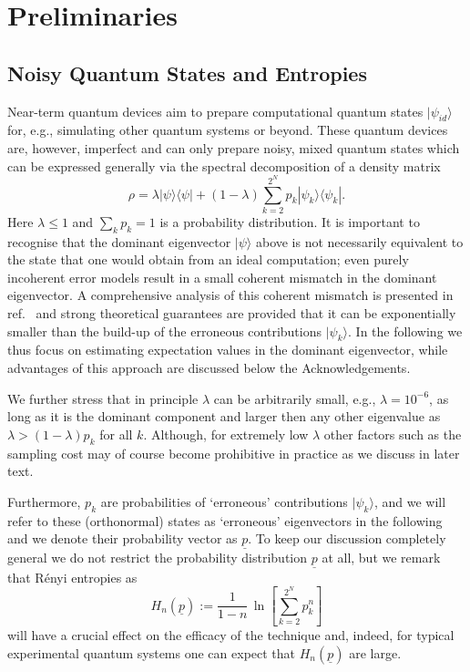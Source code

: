 \documentclass[aps,prx,showpacs,twocolumn,reprint]{revtex4-2}
\begin{document}
\section{Preliminaries}

\subsection{Noisy Quantum States and Entropies}

Near-term quantum devices aim to prepare computational
quantum states $| \psi_{id} \rangle$ for, e.g., simulating other quantum systems or beyond.
These quantum devices are, however, imperfect and can only prepare noisy, mixed quantum states
which can be expressed generally via the spectral decomposition of a density matrix	
\begin{equation}\label{rhodef}
\rho = \lambda | \psi \rangle \langle \psi  | + (1-\lambda) \sum_{k=2}^{2^N} p_k | \psi_k \rangle \langle \psi_k  |.
\end{equation}
Here $\lambda \leq 1$ and $\sum_k p_k = 1$ is a probability distribution. 
It is important to recognise that the dominant eigenvector $| \psi \rangle$ above is not necessarily
equivalent to the state that one would obtain from an ideal computation; even 
purely incoherent error models result in a small coherent mismatch in the dominant eigenvector.
A comprehensive analysis of this coherent mismatch is presented in ref.~\cite{koczor2021dominant}
and strong theoretical guarantees are provided that it can be exponentially smaller
than the build-up of the erroneous contributions $ | \psi_k \rangle$.
In the following we thus focus on estimating expectation values in the dominant eigenvector,
while advantages of this approach are discussed below the Acknowledgements.


We further stress that in principle $\lambda$ can be arbitrarily small, e.g., $\lambda=10^{-6}$,
as long as it is the dominant component and larger then any other eigenvalue
as $\lambda > (1-\lambda) p_k$ for all $k$.
Although, for extremely low $\lambda$ other factors such as the sampling cost
may of course become prohibitive in practice as we discuss in later text.

Furthermore, $p_k$ are probabilities of `erroneous' contributions $| \psi_k \rangle$,
and we will refer to these (orthonormal) states as `erroneous' eigenvectors in the following
and we denote their probability vector as $\underline{p}$.
To keep our discussion completely general we do not restrict the probability distribution $\underline{p}$
at all, but we remark that R{\'e}nyi entropies \cite{renyi1961measures} as
$$H_n(\underline{p}) := \frac{1}{1-n} \, \ln [\sum_{k=2}^{2^N} p^n_k  ]$$
will have a crucial effect on the efficacy of the technique and, indeed, for typical experimental quantum systems one can expect
that $H_n(\underline{p})$ are large.
\end{document}
